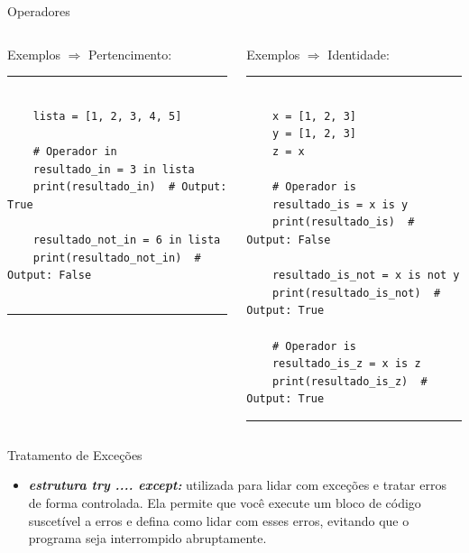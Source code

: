 \documentclass{beamer}
\begin{document}
\begin{frame}[fragile]{Operadores}
	
	\label{operadores_pertinencia_exemplos}
	\begin{columns}
		\begin{column}{0.5\textwidth}
			Exemplos $\Rightarrow$ Pertencimento:
			\rule{\textwidth}{1pt}
			\scriptsize
			\begin{verbatim}
				
	lista = [1, 2, 3, 4, 5]
	
	# Operador in
	resultado_in = 3 in lista
	print(resultado_in)  # Output: True
	
	resultado_not_in = 6 in lista
	print(resultado_not_in)  # Output: False
				
			\end{verbatim}
			\rule{\textwidth}{1pt}
		\end{column}
		\begin{column}{0.5\textwidth}
			Exemplos $\Rightarrow$ Identidade:
			
			\rule{\textwidth}{1pt}
			\scriptsize
			\begin{verbatim}
				
	x = [1, 2, 3]
	y = [1, 2, 3]
	z = x
	
	# Operador is
	resultado_is = x is y
	print(resultado_is)  # Output: False
	
	resultado_is_not = x is not y
	print(resultado_is_not)  # Output: True
	
	# Operador is
	resultado_is_z = x is z
	print(resultado_is_z)  # Output: True

			\end{verbatim}
			
			\rule{\textwidth}{1pt}
		\end{column}
	\end{columns}
\end{frame}



\begin{frame}[fragile]{Tratamento de Exceções}
	\label{tratamento_de_excecoes}
	\begin{itemize}
		\item  \textbf{\textit{estrutura try .... except:}} utilizada para lidar com exceções e tratar erros de forma controlada. Ela permite que você execute um bloco de código suscetível a erros e defina como lidar com esses erros, evitando que o programa seja interrompido abruptamente. 
	\end{itemize}
\end{frame}
\end{document}

